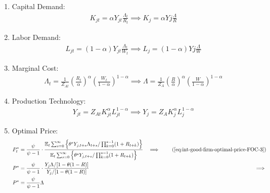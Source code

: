 \documentclass[
	12pt, 
	]{article}
\numberwithin{equation}{section}
\newcommand{\E}[1][t]{{\mathbb{E}_{#1}}}
\theoremstyle{definition}
\theoremstyle{plain}
\theoremstyle{plain}
\theoremstyle{plain}
\begin{document}
\begin{enumerate}
	\item Capital Demand:
	\begin{align}
	\label{eq:ss-int-good-firm-FOC-Kt}
		K_{jt} = \alpha Y_{jt} \frac{\Lambda_t}{R_t} \implies 
		K_{j} = \alpha Y{j} \frac{\Lambda}{R}
	\end{align}
		
	\item Labor Demand:
	\begin{align}
	\label{eq:ss-int-good-firm-FOC-Lt}
		L_{jt} = (1-\alpha) Y_{jt} \frac{\Lambda_t}{W_t} \implies 
		L_{j} = (1-\alpha) Y{j} \frac{\Lambda}{W}
	\end{align}
	
	
	\item Marginal Cost:
	\begin{align}
	\label{eq:ss-int-good-firm-MC-2}
		\Lambda_t = \frac{1}{Z_{At}} \left( \frac{R_t}{\alpha} \right)^{\alpha} \left( \frac{W_t}{1-\alpha} \right)^{1-\alpha} \implies
		\Lambda = \frac{1}{Z_{A}} \left( \frac{R}{\alpha} \right)^{\alpha} \left( \frac{W}{1-\alpha} \right)^{1-\alpha}
	\end{align}
		
	\item Production Technology:
	\begin{align}
	\label{eq:ss-int-good-firm-production-function}
		Y_{jt} = Z_{At} K_{jt}^\alpha L_{jt}^{1-\alpha} \implies 
		Y_{j} = Z_{A} K_{j}^\alpha L_{j}^{1-\alpha}
	\end{align}
		
	\item Optimal Price:
	\begin{alignat}{2}
	P_t^\ast &= \frac{\psi}{\psi-1} \cdot \frac{\E \sum_{s=0}^{\infty} \left\{\theta^s Y_{j,t+s} \Lambda_{t+s} / \prod_{k=0}^{s-1}(1+R_{t+k}) \right\}} {\E \sum_{s=0}^{\infty} \left\{ \theta^s Y_{j,t+s} / \prod_{k=0}^{s-1}(1+R_{t+k}) \right\}} &\implies \tag{\ref{eq:int-good-firm-optimal-price-FOC-3}} \\
	P^\ast &= \frac{\psi}{\psi-1} \cdot \frac{ Y_j \Lambda / [1-\theta(1-R)]} {Y_j / [1-\theta(1-R)]} &\implies \nonumber \\
	P^\ast &= \frac{\psi}{\psi-1} \Lambda \label{eq:ss-int-good-firm-optimal-price-FOC-3}
	\end{alignat}
	

\end{enumerate}
\end{document}
